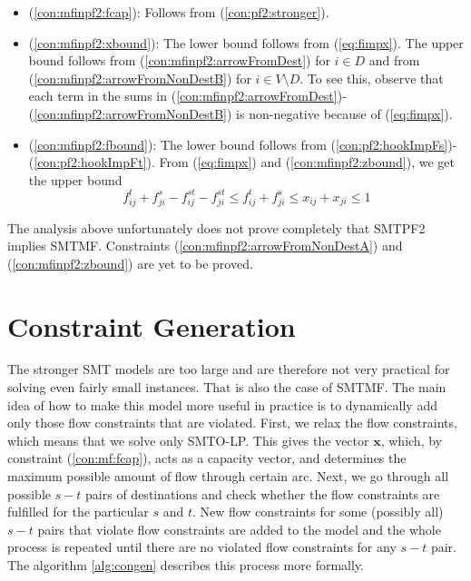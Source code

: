 \begin{itemize}
\item[] (\ref{con:mfinpf2:fcap}): Follows from (\ref{con:pf2:stronger}).



\item[] (\ref{con:mfinpf2:xbound}): The lower bound follows from (\ref{eq:fimpx}). The upper bound follows from (\ref{con:mfinpf2:arrowFromDest}) for $i\in D$ and from (\ref{con:mfinpf2:arrowFromNonDestB}) for $i\in V\setminus D$. To see this, observe that each term in the sums in (\ref{con:mfinpf2:arrowFromDest})-(\ref{con:mfinpf2:arrowFromNonDestB}) is non-negative because of (\ref{eq:fimpx}). 
\item[] (\ref{con:mfinpf2:fbound}): The lower bound follows from (\ref{con:pf2:hookImpFs})-(\ref{con:pf2:hookImpFt}). From (\ref{eq:fimpx}) and (\ref{con:mfinpf2:zbound}), we get the upper bound
$$f^t_{ij}+f^s_{ji}-f^{st}_{ij}-f^{st}_{ji}\leq f^t_{ij}+f^s_{ji}\leq x_{ij}+x_{ji}\leq 1$$
\end{itemize}
The analysis above unfortunately does not prove completely that SMTPF2 implies SMTMF. Constraints (\ref{con:mfinpf2:arrowFromNonDestA}) and (\ref{con:mfinpf2:zbound}) are yet to be proved.  

\section{Constraint Generation}
The stronger SMT models are too large and are therefore not very practical for solving even fairly small instances. That is also the case of SMTMF. The main idea of how to make this model more useful in practice is to dynamically add only those flow constraints that are violated. First, we relax the flow constraints, which means that we solve only SMTO-LP. This gives the vector $\mathbf{x}$, which, by constraint (\ref{con:mf:fcap}), acts as a capacity vector, and determines the maximum possible amount of flow through certain arc. Next, we go through all possible $s-t$ pairs of destinations and check whether the flow constraints are fulfilled for the particular $s$ and $t$. New flow constraints for some (possibly all) $s-t$ pairs that violate flow constraints are added to the model and the whole process is repeated until there are no violated flow constraints for any $s-t$ pair. The algorithm \ref{alg:congen} describes this process more formally.

